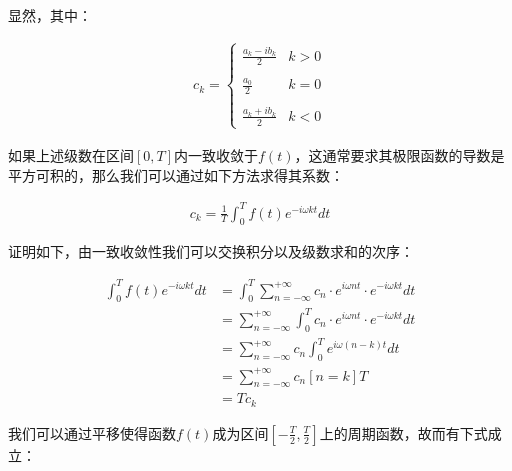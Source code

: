 \documentclass[UTF8]{book}
\begin{document}
显然，其中：
\begin{large}
    \begin{equation}
        \begin{aligned}
            c_k=\left\{\begin{matrix}
                \displaystyle{\frac{a_k-ib_k}{2}} & k>0 \\
                & \\
                \displaystyle{\frac{a_0}{2}} & k=0 \\
                & \\
                \displaystyle{\frac{a_k+ib_k}{2}} & k<0
                \end{matrix}\right.
            \nonumber
        \end{aligned}
    \end{equation}
\end{large}
如果上述级数在区间$\left [ 0,T \right ]$内一致收敛于$f(t)$，这通常要求其极限函数的导数是平方可积的，那么我们可以通过如下方法求得其系数：
\begin{large}
    \begin{equation}
        \begin{aligned}
            c_k=\frac{1}{T}\int_{0}^{T}{f(t)e^{-i\omega kt}dt}
            \nonumber
        \end{aligned}
    \end{equation}
\end{large}
证明如下，由一致收敛性我们可以交换积分以及级数求和的次序：
\begin{large}
    \begin{equation}
        \begin{aligned}
            \int_{0}^{T}{f(t)e^{-i\omega kt}dt} &= \int_{0}^{T}{\sum_{n=-\infty}^{+\infty} c_n \cdot e^{i\omega nt} \cdot e^{-i\omega kt}dt} \\
            &= \sum_{n=-\infty}^{+\infty}{\int_{0}^{T} c_n \cdot e^{i\omega nt} \cdot e^{-i\omega kt}dt} \\
            &= \sum_{n=-\infty}^{+\infty}{c_n\int_{0}^{T} e^{i\omega (n-k)t}dt} \\
            &= \sum_{n=-\infty}^{+\infty}{c_n[n=k]T} \\
            &= Tc_k
            \nonumber
        \end{aligned}
    \end{equation}
\end{large}
我们可以通过平移使得函数$f(t)$成为区间$[-\frac{T}{2},\frac{T}{2}]$上的周期函数，故而有下式成立：
\end{document}
